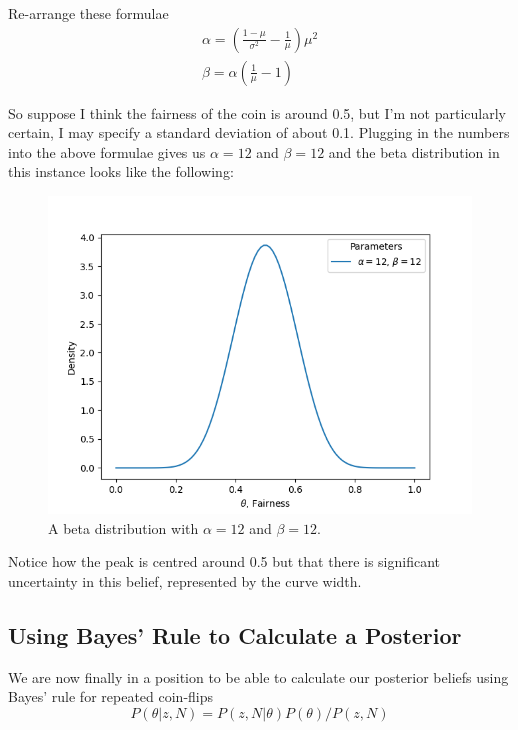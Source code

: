 Re-arrange these formulae 
\begin{equation}
  \begin{gathered}
    \alpha = \left(\frac{1-\mu}{\sigma^2} - \frac{1}{\mu} \right) \mu^2\\
    \beta = \alpha\left(\frac{1}{\mu}-1 \right)
  \end{gathered}
\end{equation}


So suppose I think the fairness of the coin is around 0.5, but I'm not particularly certain, I may specify a standard deviation of about 0.1. Plugging in the numbers into the above formulae gives us $\alpha = 12$ and $\beta = 12$ and the beta distribution in this instance looks like the following:
\begin{figure}[htb]
  \centering
  \includegraphics[width=.7\textwidth]{figures/beta_12_12}
  \caption{A beta distribution with $\alpha=12$ and $\beta=12$.}
  \label{fig:beta_12_12}
\end{figure}

Notice how the peak is centred around 0.5 but that there is significant uncertainty in this belief, represented by the curve width.

\subsection{Using Bayes' Rule to Calculate a Posterior}

We are now finally in a position to be able to calculate our posterior beliefs using Bayes' rule for repeated coin-flips
\begin{equation}
  P(\theta|z,N)=P(z,N|\theta)P(\theta)/P(z,N)
\end{equation}

